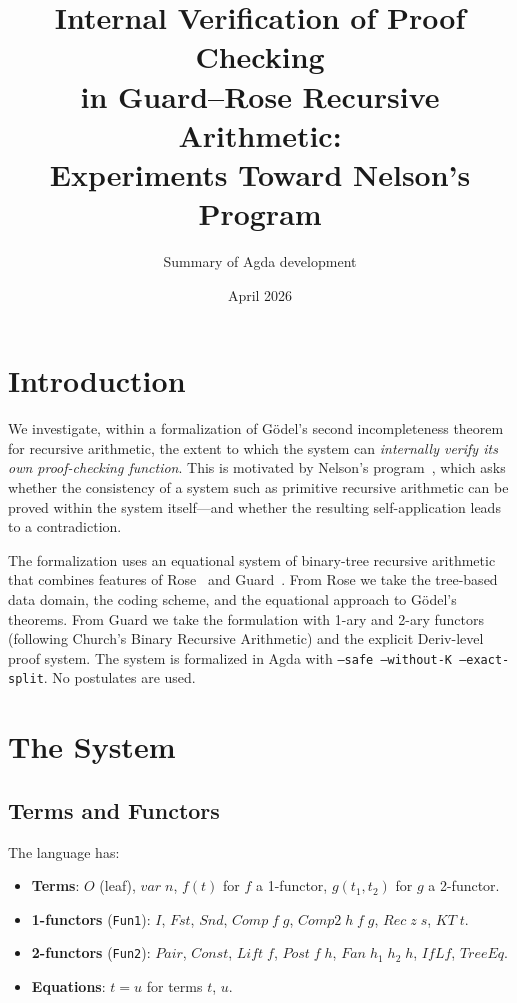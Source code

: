 \documentclass[11pt]{article}
\title{Internal Verification of Proof Checking\\
in Guard--Rose Recursive Arithmetic:\\
Experiments Toward Nelson's Program}
\author{Summary of Agda development}
\date{April 2026}
\begin{document}
\maketitle

\section{Introduction}

We investigate, within a formalization of G\"odel's second incompleteness
theorem for recursive arithmetic, the extent to which the system can
\emph{internally verify its own proof-checking function}. This is
motivated by Nelson's program~\cite{nelson}, which asks whether the
consistency of a system such as primitive recursive arithmetic can be
proved within the system itself---and whether the resulting self-application
leads to a contradiction.

The formalization uses an equational system of binary-tree recursive
arithmetic that combines features of Rose~\cite{rose1961} and
Guard~\cite{guard1963}. From Rose we take the tree-based data domain,
the coding scheme, and the equational approach to G\"odel's theorems.
From Guard we take the formulation with 1-ary and 2-ary functors
(following Church's Binary Recursive Arithmetic) and the explicit
Deriv-level proof system. The system is formalized in Agda with
\texttt{--safe --without-K --exact-split}. No postulates are used.

\section{The System}

\subsection{Terms and Functors}

The language has:
\begin{itemize}
\item \textbf{Terms}: $O$ (leaf), $\mathit{var}\;n$, $f(t)$ for $f$ a
  1-functor, $g(t_1, t_2)$ for $g$ a 2-functor.
\item \textbf{1-functors} (\texttt{Fun1}): $I$, $\mathit{Fst}$,
  $\mathit{Snd}$, $\mathit{Comp}\;f\;g$, $\mathit{Comp2}\;h\;f\;g$,
  $\mathit{Rec}\;z\;s$, $\mathit{KT}\;t$.
\item \textbf{2-functors} (\texttt{Fun2}): $\mathit{Pair}$,
  $\mathit{Const}$, $\mathit{Lift}\;f$, $\mathit{Post}\;f\;h$,
  $\mathit{Fan}\;h_1\;h_2\;h$, $\mathit{IfLf}$, $\mathit{TreeEq}$.
\item \textbf{Equations}: $t = u$ for terms $t$, $u$.
\end{itemize}
\end{document}
